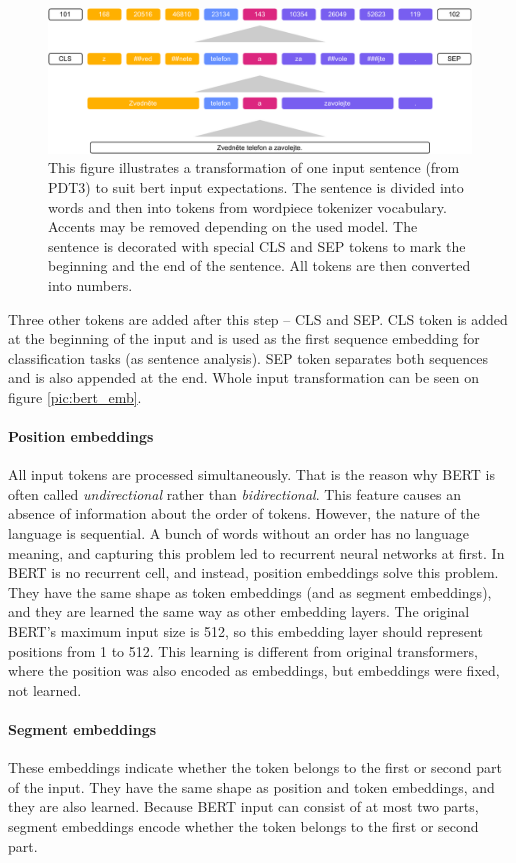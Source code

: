 \begin{figure}[H]
\centering
\includegraphics[width=1\columnwidth]{../img/bert_input}
\protect\caption{This figure illustrates a transformation of one input sentence (from PDT3) to suit bert input expectations. The sentence is divided into words and then into tokens from wordpiece tokenizer vocabulary. Accents may be removed depending on the used model. The sentence is decorated with special CLS and SEP tokens to mark the beginning and the end of the sentence. All tokens are then converted into numbers. }
\label{pic:bert_inp}
\end{figure}
\par
Three other tokens are added after this step -- CLS and SEP. 
CLS token is added at the beginning of the input and is used as the first sequence embedding for classification tasks (as sentence analysis). SEP token separates both sequences and is also appended at the end. Whole input transformation can be seen on figure \ref{pic:bert_emb}.
\paragraph{Position embeddings}
All input tokens are processed simultaneously. That is the reason why BERT is often called \textit{undirectional} rather than \textit{bidirectional}. This feature causes an absence of information about the order of tokens. However, the nature of the language is sequential. A bunch of words without an order has no language meaning, and capturing this problem led to recurrent neural networks at first. In BERT is no recurrent cell, and instead, position embeddings solve this problem. They have the same shape as token embeddings (and as segment embeddings), and they are learned the same way as other embedding layers. The original BERT's maximum input size is 512, so this embedding layer should represent positions from 1 to 512. This learning is different from original transformers, where the position was also encoded as embeddings, but embeddings were fixed, not learned.
\paragraph{Segment embeddings}
These embeddings indicate whether the token belongs to the first or second part of the input. They have the same shape as position and token embeddings, and they are also learned. Because BERT input can consist of at most two parts, segment embeddings encode whether the token belongs to the first or second part.
